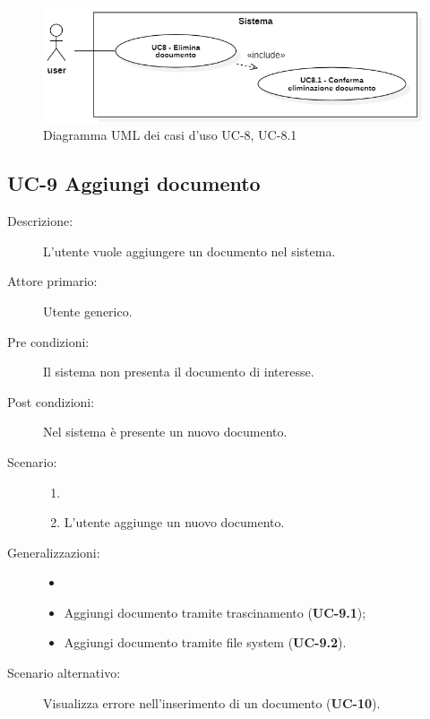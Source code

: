 \begin{figure}[H]
    \centering
    \includegraphics[width=0.8\linewidth]{UC8.png} %
    \caption{Diagramma UML dei casi d'uso UC-8, UC-8.1}
    \label{fig:UC10-11}
\end{figure}

\subsection{UC-9 Aggiungi documento}
\begin{description}
    \item[Descrizione:] L'utente vuole aggiungere un documento nel sistema.
    \item[Attore primario:] Utente generico.
    \item[Pre condizioni:] Il sistema non presenta il documento di interesse.
    \item[Post condizioni:] Nel sistema è presente un nuovo documento.
    \item[Scenario:]
    \begin{enumerate}
        \item[]
        \item L’utente aggiunge un nuovo documento.
    \end{enumerate}
    \item[Generalizzazioni:] 
    \begin{itemize}
        \item[] 
        \item Aggiungi documento tramite trascinamento (\textbf{UC-9.1});
        \item Aggiungi documento tramite file system (\textbf{UC-9.2}).
    \end{itemize} 
    \item[Scenario alternativo:] Visualizza errore nell'inserimento di un documento (\textbf{UC-10}).
\end{description}

